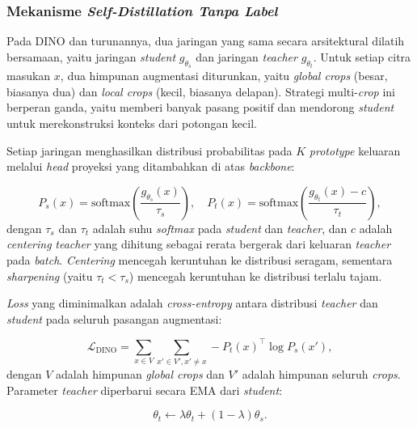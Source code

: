 \subsubsection{Mekanisme \textit{Self-Distillation Tanpa Label}}

Pada DINO dan turunannya, dua jaringan yang sama secara arsitektural dilatih bersamaan, yaitu jaringan \textit{student} $g_{\theta_s}$ dan jaringan \textit{teacher} $g_{\theta_t}$. Untuk setiap citra masukan $x$, dua himpunan augmentasi diturunkan, yaitu \textit{global crops} (besar, biasanya dua) dan \textit{local crops} (kecil, biasanya delapan). Strategi multi-\textit{crop} ini berperan ganda, yaitu memberi banyak pasang positif dan mendorong \textit{student} untuk merekonstruksi konteks dari potongan kecil.

Setiap jaringan menghasilkan distribusi probabilitas pada $K$ \textit{prototype} keluaran melalui \textit{head} proyeksi yang ditambahkan di atas \textit{backbone}:

\begin{equation}
    P_s(x) = \text{softmax}\!\left( \frac{g_{\theta_s}(x)}{\tau_s} \right), \quad
    P_t(x) = \text{softmax}\!\left( \frac{g_{\theta_t}(x) - c}{\tau_t} \right),
    \label{eq:dino}
\end{equation}
dengan $\tau_s$ dan $\tau_t$ adalah suhu \textit{softmax} pada \textit{student} dan \textit{teacher}, dan $c$ adalah \textit{centering} \textit{teacher} yang dihitung sebagai rerata bergerak dari keluaran \textit{teacher} pada \textit{batch}. \textit{Centering} mencegah keruntuhan ke distribusi seragam, sementara \textit{sharpening} (yaitu $\tau_t < \tau_s$) mencegah keruntuhan ke distribusi terlalu tajam.

\textit{Loss} yang diminimalkan adalah \textit{cross-entropy} antara distribusi \textit{teacher} dan \textit{student} pada seluruh pasangan augmentasi:

\begin{equation}
    \mathcal{L}_{\text{DINO}} = \sum_{x \in V} \sum_{x' \in V', x' \neq x} - P_t(x)^\top \log P_s(x'),
    \label{eq:dino_loss}
\end{equation}
dengan $V$ adalah himpunan \textit{global crops} dan $V'$ adalah himpunan seluruh \textit{crops}. Parameter \textit{teacher} diperbarui secara EMA dari \textit{student}:

\begin{equation}
    \theta_t \leftarrow \lambda \theta_t + (1-\lambda) \theta_s.
    \label{eq:dino_ema}
\end{equation}

